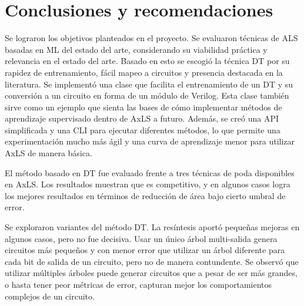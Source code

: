 \chapter{Conclusiones y recomendaciones}




Se lograron los objetivos planteados en el proyecto.
Se evaluaron técnicas de ALS basadas en ML del estado del arte, considerando su
viabilidad práctica y relevancia en el estado del arte.
Basado en esto se escogió la técnica DT por su rapidez de entrenamiento, fácil
mapeo a circuitos y presencia destacada en la literatura.
Se implementó una clase que facilita el entrenamiento de un DT y su conversión
a un circuito en forma de un módulo de Verilog. Esta clase también sirve como
un ejemplo que sienta las bases de cómo implementar métodos de aprendizaje
supervisado dentro de AxLS a futuro.
Además, se creó una API simplificada y una CLI para ejecutar diferentes
métodos, lo que permite una experimentación mucho más ágil y una curva de
aprendizaje menor para utilizar AxLS de manera básica.

El método basado en DT fue evaluado frente a tres técnicas de poda disponibles
en AxLS. Los resultados muestran que es competitivo, y en algunos casos logra
los mejores resultados en términos de reducción de área bajo cierto umbral de
error.

Se exploraron variantes del método DT. La resíntesis aportó pequeñas mejoras en
algunos casos, pero no fue decisiva.
Usar un único árbol multi-salida genera circuitos más pequeños y con menor
error que utilizar un árbol diferente para cada bit de salida de un circuito,
pero no de manera contundente. Se observó que utilizar múltiples árboles puede
generar circuitos que a pesar de ser más grandes, o hasta tener peor métricas
de error, capturan mejor los comportamientos complejos de un circuito.

